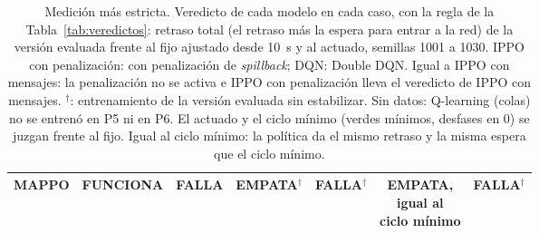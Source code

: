 \begin{table}[!tbp]
\begin{tabular}{lcccccc}
MAPPO & FUNCIONA & FALLA & EMPATA$^{\dagger}$ & FALLA$^{\dagger}$ & \makecell{EMPATA,\\igual al\\ciclo mínimo} & FALLA$^{\dagger}$ \\
\bottomrule
\end{tabular}
\caption[Medición más estricta: veredicto por caso y modelo]{Medición más estricta. Veredicto de cada modelo en cada caso, con la regla de la Tabla~\ref{tab:veredictos}: retraso total (el retraso más la espera para entrar a la red) de la versión evaluada frente al fijo ajustado desde 10~s y al actuado, semillas 1001 a 1030. IPPO con penalización: con penalización de \textit{spillback}; DQN: Double DQN. Igual a IPPO con mensajes: la penalización no se activa e IPPO con penalización lleva el veredicto de IPPO con mensajes. $^{\dagger}$: entrenamiento de la versión evaluada sin estabilizar. Sin datos: Q-learning (colas) no se entrenó en P5 ni en P6. El actuado y el ciclo mínimo (verdes mínimos, desfases en 0) se juzgan frente al fijo. Igual al ciclo mínimo: la política da el mismo retraso y la misma espera que el ciclo mínimo.}
\label{tab:robustez-veredicto-matriz}
\end{table}
